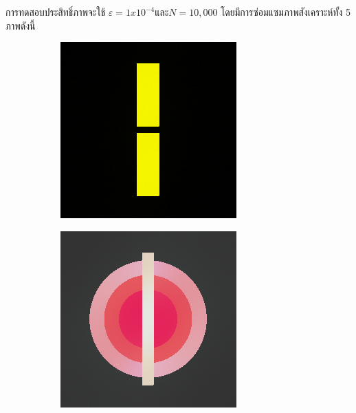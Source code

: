 \documentclass[hidelinks, a4paper,12pt]{article}
\numberwithin{equation}{section}							%
\numberwithin{equation}{section}
\begin{document}
{	\hspace{1cm}
	การทดสอบประสิทธิ์ภาพจะใช้ $\varepsilon = 1x10^{-4} และ N= 10,000$ โดยมีการซ่อมแซมภาพสังเคราะห์ทั้ง 5 ภาพดังนี้
	\begin{figure}[H]
		\centering
		\begin{subfigure}{0.4\linewidth}
			\centering
			\includegraphics[width=0.8\linewidth]{images/result_ex1/timemarch01.png}
		\end{subfigure}
		\begin{subfigure}{0.4\linewidth}
			\centering
			\includegraphics[width=0.8\linewidth]{images/result_ex1/timemarch02.png}

\end{subfigure}
\end{figure}}
\end{document}
